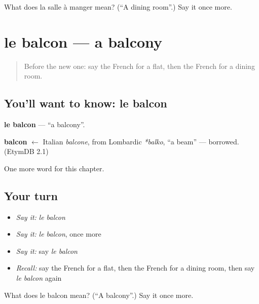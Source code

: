 \begin{tcolorbox}[breakable,colback=teal!4,colframe=teal!35!black,title={Before you move on}]
What does la salle à manger mean? (\textquotedblleft{}A dining room\textquotedblright{}.) Say it once more.
\end{tcolorbox}
\section[le balcon]{le balcon — a balcony}

\label{lesson:FR-C163-balcon}



\begin{quote}
Before the new one: say the French for a flat, then the French for a dining room.
\end{quote}

\subsection*{You'll want to know: le balcon}
\textbf{le balcon} — \textquotedblleft{}a balcony\textquotedblright{}.

\begin{cousinweb}
\textbf{balcon} $\leftarrow$ Italian \emph{balcone}, from Lombardic \emph{*balko}, \textquotedblleft{}a beam\textquotedblright{} — borrowed. (EtymDB 2.1)
\end{cousinweb}

\begin{grammarlens}[title={What you've built}]
One more word for this chapter.
\end{grammarlens}

\subsection*{Your turn}
\begin{itemize}
\raggedright
  \item \emph{Say it:} \emph{le balcon}
  \item \emph{Say it:} \emph{le balcon}, once more
  \item \emph{Say it:} say \emph{le balcon}
  \item \emph{Recall:} say the French for a flat, then the French for a dining room, then say \emph{le balcon} again
\end{itemize}

\begin{tcolorbox}[breakable,colback=teal!4,colframe=teal!35!black,title={Before you move on}]
What does le balcon mean? (\textquotedblleft{}A balcony\textquotedblright{}.) Say it once more.
\end{tcolorbox}
